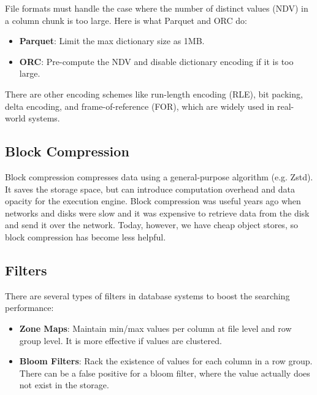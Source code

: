 \documentclass[11pt]{article}
\begin{document}
File formats must handle the case where the number of distinct values (NDV) in a column chunk is too large. Here is what Parquet and ORC do:
\begin{itemize}
    \item \textbf{Parquet}: Limit the max dictionary size as 1MB.
    \item \textbf{ORC}: Pre-compute the NDV and disable dictionary encoding if it is too large.
\end{itemize}

There are other encoding schemes like run-length encoding (RLE), bit packing, delta encoding, and frame-of-reference (FOR), which are widely used in real-world systems.

\subsection*{Block Compression}

Block compression compresses data using a general-purpose algorithm (e.g. Zstd). It saves the storage space, but can introduce computation overhead and data opacity for the execution engine. Block compression was useful years ago when networks and disks were slow and it was expensive to retrieve data from the disk and send it over the network. Today, however, we have cheap object stores, so block compression has become less helpful.

\subsection*{Filters}

There are several types of filters in database systems to boost the searching performance:

\begin{itemize}
    \item \textbf{Zone Maps}: Maintain min/max values per column at file level and row group level. It is more effective if values are clustered.
    \item \textbf{Bloom Filters}: Rack the existence of values for each column in a row group. There can be a false positive for a bloom filter, where the value actually does not exist in the storage.
\end{itemize}
\end{document}
